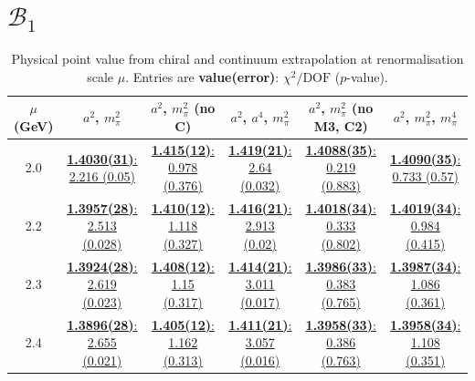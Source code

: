 \documentclass[12pt]{extarticle}
\begin{document}
\section{$\mathcal{B}_1$}
\begin{table}[h!]
\begin{center}
\begin{tabular}{|c|c|c|c|c|c|}
\hline
$\mu$ (GeV) & $a^2$, $m_\pi^2$& $a^2$, $m_\pi^2$ (no C)& $a^2$, $a^4$, $m_\pi^2$& $a^2$, $m_\pi^2$ (no M3, C2)& $a^2$, $m_\pi^2$, $m_\pi^4$\\
\hline
2.0& \hyperlink{VVpAA/SUSY/a2m2_20.pdf.1}{\textbf{1.4030(31)}: 2.216 (0.05)} & \hyperlink{VVpAA/SUSY/a2m2noC_20.pdf.1}{\textbf{1.415(12)}: 0.978 (0.376)} & \hyperlink{VVpAA/SUSY/a2a4m2_20.pdf.1}{\textbf{1.419(21)}: 2.64 (0.032)} & \hyperlink{VVpAA/SUSY/a2m2mcut_20.pdf.1}{\textbf{1.4088(35)}: 0.219 (0.883)} & \hyperlink{VVpAA/SUSY/a2m2m4_20.pdf.1}{\textbf{1.4090(35)}: 0.733 (0.57)}\\
2.2& \hyperlink{VVpAA/SUSY/a2m2_22.pdf.1}{\textbf{1.3957(28)}: 2.513 (0.028)} & \hyperlink{VVpAA/SUSY/a2m2noC_22.pdf.1}{\textbf{1.410(12)}: 1.118 (0.327)} & \hyperlink{VVpAA/SUSY/a2a4m2_22.pdf.1}{\textbf{1.416(21)}: 2.913 (0.02)} & \hyperlink{VVpAA/SUSY/a2m2mcut_22.pdf.1}{\textbf{1.4018(34)}: 0.333 (0.802)} & \hyperlink{VVpAA/SUSY/a2m2m4_22.pdf.1}{\textbf{1.4019(34)}: 0.984 (0.415)}\\
2.3& \hyperlink{VVpAA/SUSY/a2m2_23.pdf.1}{\textbf{1.3924(28)}: 2.619 (0.023)} & \hyperlink{VVpAA/SUSY/a2m2noC_23.pdf.1}{\textbf{1.408(12)}: 1.15 (0.317)} & \hyperlink{VVpAA/SUSY/a2a4m2_23.pdf.1}{\textbf{1.414(21)}: 3.011 (0.017)} & \hyperlink{VVpAA/SUSY/a2m2mcut_23.pdf.1}{\textbf{1.3986(33)}: 0.383 (0.765)} & \hyperlink{VVpAA/SUSY/a2m2m4_23.pdf.1}{\textbf{1.3987(34)}: 1.086 (0.361)}\\
2.4& \hyperlink{VVpAA/SUSY/a2m2_24.pdf.1}{\textbf{1.3896(28)}: 2.655 (0.021)} & \hyperlink{VVpAA/SUSY/a2m2noC_24.pdf.1}{\textbf{1.405(12)}: 1.162 (0.313)} & \hyperlink{VVpAA/SUSY/a2a4m2_24.pdf.1}{\textbf{1.411(21)}: 3.057 (0.016)} & \hyperlink{VVpAA/SUSY/a2m2mcut_24.pdf.1}{\textbf{1.3958(33)}: 0.386 (0.763)} & \hyperlink{VVpAA/SUSY/a2m2m4_24.pdf.1}{\textbf{1.3958(34)}: 1.108 (0.351)}\\
\hline
\end{tabular}
\caption{Physical point value from chiral and continuum extrapolation at renormalisation scale $\mu$. Entries are \textbf{value(error)}: $\chi^2/\text{DOF}$ ($p$-value).}
\end{center}
\end{table}
\end{document}
